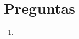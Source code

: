 \documentclass[11pt]{article}
\begin{document}


\section*{Preguntas}

\begin{enumerate}
    \item 
\end{enumerate}
\end{document}
